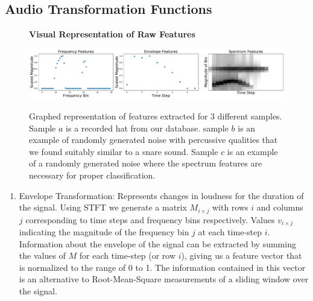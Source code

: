 \documentclass[runningheads,a4paper]{llncs}
\begin{document}
\begin{appendices}
\chapter{Audio Transformation Functions}
\label{appendix:B}
\begin{figure}
\centering
\textbf{Visual Representation of Raw Features}\par\medskip
    { \includegraphics[width=1\columnwidth]{images/ff3.pdf}}
\caption{Graphed representation of features extracted for 3 different samples. Sample $a$ is a recorded hat from our database. sample $b$ is an example of randomly generated noise with percussive qualities that we found suitably similar to a snare sound. Sample $c$ is an example of a randomly generated noise where the spectrum features are necessary for proper classification.}
\label{fig:stackspectrums}
\end{figure}
\begin{enumerate}
\item Envelope Transformation: Represents changes in loudness for the duration of the signal. Using STFT we generate a matrix $M_{i \times j}$ with rows $i$ and columns $j$ corresponding to time steps and frequency bins respectively. Values $v_{i \times j}$ indicating the magnitude of the frequency bin $j$ at each time-step $i$. Information about the envelope of the signal can be extracted by summing the values of $M$ for each time-step (or row $i$), giving us a feature vector that is normalized to the range of 0 to 1. The information contained in this vector is an alternative to Root-Mean-Square measurements of a sliding window over the signal.

\end{enumerate}
\end{appendices}
\end{document}
